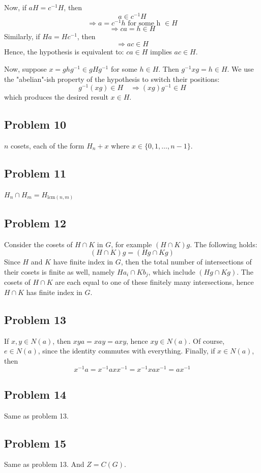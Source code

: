 \documentclass{book}
\begin{document}
Now, if $aH = c^{-1}H$, then
$$a \in c^{-1}H$$
$$\Rightarrow a = c^{-1}h \text{ for some h } \in H$$
$$\Rightarrow ca = h \in H$$
Similarly, if $Ha = Hc^{-1}$, then
$$\Rightarrow ac \in H$$
Hence, the hypothesis is equivalent to: $ca \in H$ implies $ac \in H$.

Now, suppose $x = ghg^{-1} \in gHg^{-1}$ for some $h \in H$. Then $g^{-1}xg = h \in H$. We use the "abelian"-ish property of the hypothesis to switch their positions:
$$g^{-1}(xg) \in H \quad \Rightarrow (xg)g^{-1} \in H$$
which produces the desired result $x \in H$.

\subsection*{Problem 10}
$n$ cosets, each of the form $H_n + x$ where $x \in \{ 0, 1, \ldots, n - 1 \}$.

\subsection*{Problem 11}
$H_n \cap H_m = H_{\text{lcm} (n, m)}$

\subsection*{Problem 12}
Consider the cosets of $H \cap K$ in $G$, for example $(H \cap K)g$. The following holds:
$$(H \cap K)g = (Hg \cap Kg)$$
Since $H$ and $K$ have finite index in $G$, then the total number of intersections of their cosets is finite as well, namely $Ha_i \cap Kb_j$, which include $(Hg \cap Kg)$. The cosets of $H \cap K$ are each equal to one of these finitely many intersections, hence $H \cap K$ has finite index in $G$.

\subsection*{Problem 13}
If $x, y \in N(a)$, then $xya = xay = axy$, hence $xy \in N(a)$. Of course, $e \in N(a)$, since the identity commutes with everything. Finally, if $x \in N(a)$, then
$$x^{-1}a = x^{-1}axx^{-1} = x^{-1}xax^{-1} = ax^{-1}$$

\subsection*{Problem 14}
Same as problem 13.

\subsection*{Problem 15}
Same as problem 13. And $Z = C(G)$.
\end{document}
